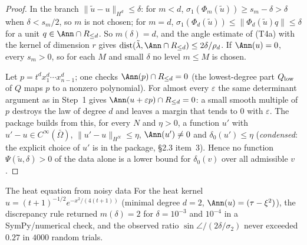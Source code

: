 \begin{proof}
In the branch $\|\tilde u-u\|_{H^d}\le\delta$: for $m<d$, $\sigma_1(\Phi_m(\tilde u))\ge s_m-\delta>\delta$ when $\delta<s_m/2$, so $m$ is not chosen; for $m=d$, $\sigma_1(\Phi_d(\tilde u))\le\|\Phi_d(\tilde u)q\|\le\delta$ for a unit $q\in\Ann\cap R_{\le d}$. So $m(\delta)=d$, and the angle estimate of (T4a) with the kernel of dimension $r$ gives $\mathrm{dist}(\tilde\lambda,\Ann\cap R_{\le d})\le2\delta/\rho_d$. If $\Ann(u)=0$, every $s_m>0$, so for each $M$ and small $\delta$ no level $m\le M$ is chosen.

Let $p=t^dx_1^d\cdots x_{n-1}^d$; one checks $\Ann(p)\cap R_{\le d}=0$ (the lowest-degree part $Q_{\rm low}$ of $Q$ maps $p$ to a nonzero polynomial). For almost every $\varepsilon$ the same determinant argument as in Step~1 gives $\Ann(u+\varepsilon p)\cap R_{\le d}=0$: a small smooth multiple of $p$ destroys the law of degree $d$ and leaves a margin that tends to $0$ with $\varepsilon$. The package builds from this, for every $N$ and $\eta>0$, a function $u'$ with $u'-u\in C^\infty(\bar\Omega)$, $\|u'-u\|_{H^N}\le\eta$, $\Ann(u')\ne0$ and $\delta_0(u')\le\eta$ (\emph{condensed}: the explicit choice of $u'$ is in the package, \S2.3 item~3). Hence no function $\Psi(\tilde u,\delta)>0$ of the data alone is a lower bound for $\delta_0(v)$ over all admissible $v$.

\end{proof}

\begin{example}{The heat equation from noisy data}
For the heat kernel $u=(t+1)^{-1/2}e^{-x^2/(4(t+1))}$ (minimal degree $d=2$, $\Ann(u)=(\tau-\xi^2)$), the discrepancy rule returned $m(\delta)=2$ for $\delta=10^{-3}$ and $10^{-4}$ in a SymPy/numerical check, and the observed ratio $\sin\angle/(2\delta/\sigma_2)$ never exceeded $0.27$ in $4000$ random trials.
\end{example}
